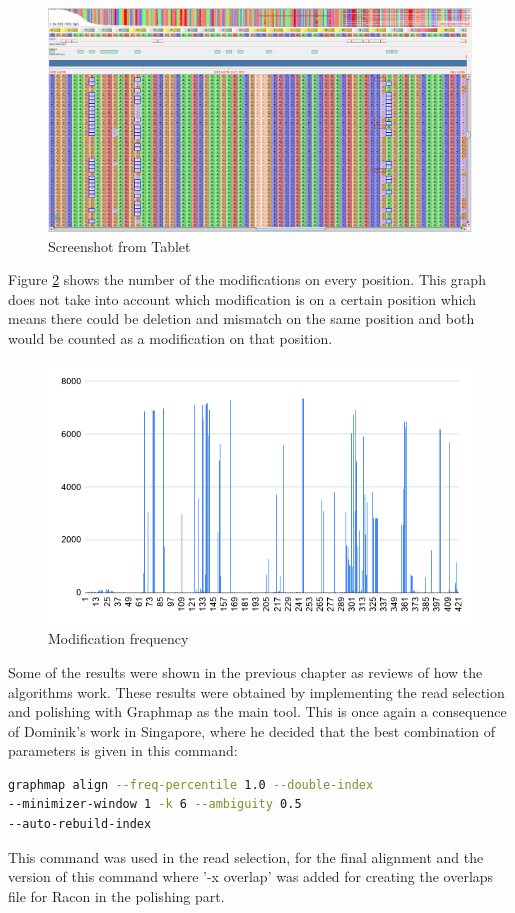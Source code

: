 \documentclass[times, utf8, zavrsni, numeric]{fer}
\begin{document}
\begin{figure}[H]
    \centering
    \includegraphics[width=\linewidth]{figures/tablet}
    \caption{Screenshot from Tablet \cite{tablet}}
    \label{fig:tablet}
\end{figure}

Figure \ref{fig:modFreq} shows the number of the modifications on every position. This graph
does not take into account which modification is on a certain position which means there 
could be deletion and mismatch on the same position and both would be counted as a modification
on that position.

\begin{figure}[H]
    \centering
    \includegraphics[width=\linewidth]{figures/modification_frequency}
    \caption{Modification frequency}
    \label{fig:modFreq}
\end{figure}

Some of the results were shown in the previous chapter as reviews of 
how the algorithms work. These results were obtained by implementing 
the read selection and polishing with Graphmap as the main tool.
This is once again a consequence of Dominik's work in Singapore, where
he decided that the best combination of parameters is given in this command:
\begin{lstlisting}[language=bash]
graphmap align --freq-percentile 1.0 --double-index 
--minimizer-window 1 -k 6 --ambiguity 0.5 
--auto-rebuild-index
\end{lstlisting}
This command was used in the read selection, for the final alignment and 
the version of this command where '-x overlap' was added
for creating the overlaps file for Racon in the polishing part.
\end{document}

